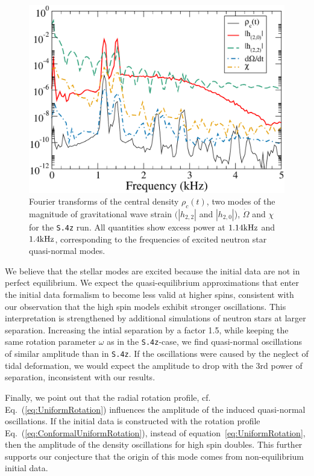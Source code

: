 \begin{figure}
\includegraphics[width=0.95\columnwidth]{chap2/ManyQuantities}
\caption[Fourier transforms of several different quantities in the {\tt S.4z} run.]{\label{fig:ManyQuantities} Fourier transforms of the central
  density $\rho_c(t)$, two modes of the magnitude of gravitational wave strain
  $(|h_{2,2}|$ and $|h_{2,0}|$), $\dot{\Omega}$ and $\chi$ for the {\tt S.4z}
  run. All quantities show excess power at $1.14\rm{kHz}$ and
  $1.4\rm{kHz}$, corresponding to the frequencies of excited neutron
  star quasi-normal modes. 
}
\end{figure}



We believe  that the  stellar  modes are  excited because  the
  initial  data  are  not  in  perfect  equilibrium.  We  expect  the
  quasi-equilibrium  approximations   that  enter  the   initial  data
  formalism to become less valid  at higher spins, consistent with our
  observation that the high spin models exhibit stronger oscillations.
  This  interpretation is  strengthened by  additional simulations  of
  neutron stars at larger separation. Increasing   the  intial
  separation  by  a  factor  1.5,  while  keeping  the  same  rotation
  parameter  $\omega$  as  in  the  {\tt S.4z}-case,  we  find  quasi-normal
  oscillations   of  similar   amplitude  than   in  {\tt S.4z}.   If  the
  oscillations were  caused by  the neglect  of tidal  deformation, we
  would expect the amplitude to drop with the 3rd power of separation,
  inconsistent with our results. 


  Finally, we point out that the radial rotation profile,
  cf. Eq.~(\ref{eq:UniformRotation}) influences the amplitude of the
  induced quasi-normal oscillations. If the initial data is
  constructed with the rotation profile
  Eq.~(\ref{eq:ConformalUniformRotation}), instead of
  equation~\ref{eq:UniformRotation}, then the amplitude of the density oscillations for
  high spin doubles. This further supports our conjecture that the
  origin of this mode comes from non-equilibrium initial data.


